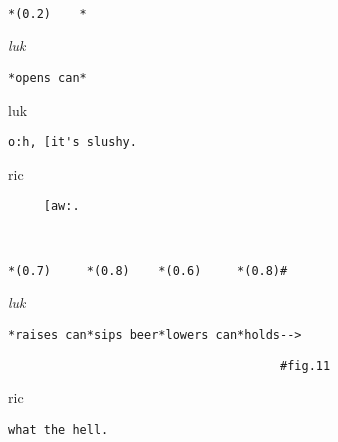 \documentclass[output=paper,nonflat,modfont,draft]{langsci/langscibook}
\begin{document}

\begin{transbox}{1}{~}
\begin{verbatim}
*(0.2)    *
\end{verbatim}
\end{transbox}

\begin{transbox}{2}{\textit{luk}}
\begin{verbatim}
*opens can*
\end{verbatim}
\end{transbox}


\begin{transbox}{4}{luk}
\begin{verbatim}
o:h, [it's slushy.
\end{verbatim}
\end{transbox}

\begin{transbox}{5}{ric}
\begin{verbatim}
     [aw:.
\end{verbatim}
\end{transbox}

\begin{transbox}{6}{~}
\begin{verbatim}
*(0.7)     *(0.8)    *(0.6)     *(0.8)#
\end{verbatim}
\end{transbox}

\begin{transbox}{7}{\textit{luk}}
\begin{verbatim}
*raises can*sips beer*lowers can*holds-->
\end{verbatim}
\end{transbox}

\begin{transbox}{8}{\fig}
\begin{verbatim}
                                      #fig.11
\end{verbatim}
\end{transbox}

\begin{transbox}{9}{ric}
\begin{verbatim}
what the hell.
\end{verbatim}
\end{transbox}

\end{document}

